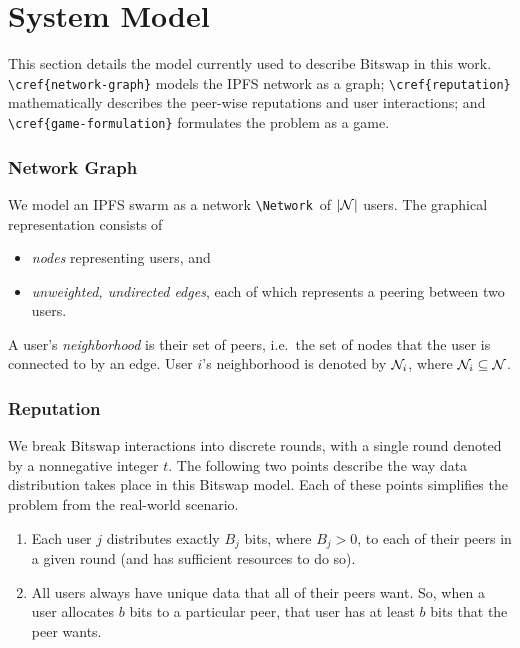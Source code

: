 \hypertarget{system-model}{%
\chapter{System Model}\label{chapter:model}}

This section details the model currently used to describe Bitswap in
this work. \texttt{\textbackslash{}cref\{network-graph\}} models the
IPFS network as a graph; \texttt{\textbackslash{}cref\{reputation\}}
mathematically describes the peer-wise reputations and user
interactions; and \texttt{\textbackslash{}cref\{game-formulation\}}
formulates the problem as a game.

\hypertarget{network-graph}{%
\subsection{Network Graph}\label{network-graph}}

We model an IPFS swarm as a network \texttt{\textbackslash{}Network}~of
$\lvert\mathcal{N}\rvert$ users. The graphical representation consists of

\begin{itemize}
\item
  \emph{nodes} representing users, and
\item
  \emph{unweighted, undirected edges}, each of which represents a
  peering between two users.
\end{itemize}

A user's \emph{neighborhood} is their set of peers, i.e.~the set of
nodes that the user is connected to by an edge. User $i$'s
neighborhood is denoted by $\mathcal{N}_{i}$, where
$\mathcal{N}_{i} \subseteq \mathcal{N}$.

\hypertarget{reputation}{%
\subsection{Reputation}\label{reputation}}

We break Bitswap interactions into discrete rounds, with a single round
denoted by a nonnegative integer $t$. The following two points
describe the way data distribution takes place in this Bitswap model.
Each of these points simplifies the problem from the real-world
scenario.

\begin{enumerate}
\def\labelenumi{\arabic{enumi}.}
\item
  Each user $j$ distributes exactly $B_j$ bits, where $B_j > 0$,
  to each of their peers in a given round (and has sufficient resources
  to do so).
\item
  All users always have unique data that all of their peers want. So,
  when a user allocates $b$ bits to a particular peer, that user has
  at least $b$ bits that the peer wants.
\end{enumerate}

